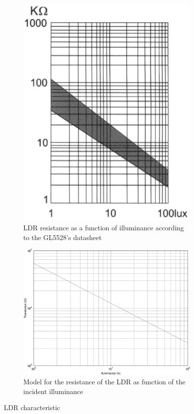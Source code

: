 \begin{figure}[h]
    \centering
    \begin{subfigure}[t]{0.39\textwidth}
	\centering
	\includegraphics[width=.95\textwidth]{img/LDR_datasheet}
	\caption{LDR resistance as a function of illuminance according to the GL5528's datasheet}
	\label{fig:LDR_datasheet}
    \end{subfigure}
    \begin{subfigure}[t]{0.59\textwidth}
	\centering
	\includegraphics[width=.95\textwidth]{img/LDR_model}
	\caption{Model for the resistance of the LDR as function of the incident illuminance}
	\label{fig:LDR_model}
    \end{subfigure}
    \caption{LDR characteristic}
\end{figure}


